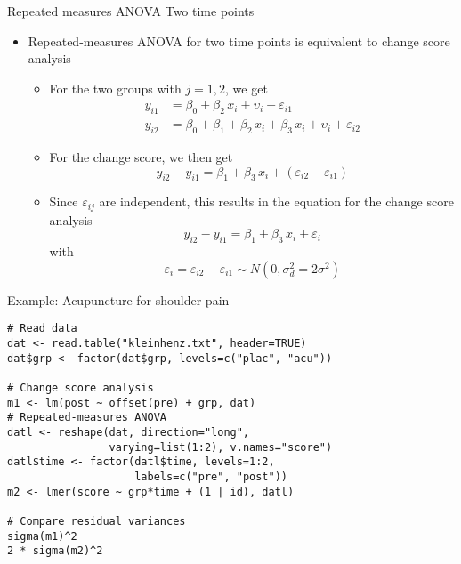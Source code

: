 \documentclass{beamer}
\begin{document}
\begin{frame}{Repeated measures ANOVA}
  {Two time points}
\begin{itemize}
  \item Repeated-measures ANOVA for two time points is equivalent to change
    score analysis
  \begin{itemize}
      \item For the two groups with $j = 1, 2$, we get
        \begin{align*}
          y_{i1} &= \beta_0 + \beta_2 \, x_i + \upsilon_i + \varepsilon_{i1}\\
          y_{i2} &= \beta_0 + \beta_1 + \beta_2 \, x_i + \beta_3 \, x_i + \upsilon_i + \varepsilon_{i2}
        \end{align*}
      \item For the change score, we then get
        \[
          y_{i2} - y_{i1} = \beta_1 + \beta_3 \, x_i + (\varepsilon_{i2} - \varepsilon_{i1})
        \]
      \item Since $\varepsilon_{ij}$ are independent, this results in the
        equation for the change score analysis
        \[
            y_{i2} - y_{i1} = \beta_1 + \beta_3 \, x_i + \varepsilon_{i}
        \]
        with
        \[
            \varepsilon_i = \varepsilon_{i2} - \varepsilon_{i1} \sim N(0, \sigma_d^2 = 2 \sigma^2)
        \]
  \end{itemize}
\end{itemize}
\end{frame}

{


\begin{frame}[fragile]{Example: Acupuncture for shoulder pain}
\begin{lstlisting}
# Read data
dat <- read.table("kleinhenz.txt", header=TRUE)
dat$grp <- factor(dat$grp, levels=c("plac", "acu"))

# Change score analysis
m1 <- lm(post ~ offset(pre) + grp, dat)
# Repeated-measures ANOVA
datl <- reshape(dat, direction="long", 
                varying=list(1:2), v.names="score")
datl$time <- factor(datl$time, levels=1:2, 
                    labels=c("pre", "post"))
m2 <- lmer(score ~ grp*time + (1 | id), datl)

# Compare residual variances
sigma(m1)^2
2 * sigma(m2)^2
\end{lstlisting}
\end{frame}

}
\end{document}
